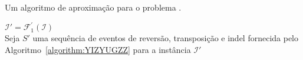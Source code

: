 \begin{algorithm}[!tbh]
  \caption{Um algoritmo de aproximação para o problema \SbFIRTI{}.\label{algorithm:JSNLHIVA}}
  $\mathcal{I}' = \mathcal{F}_{1}^{'}(\mathcal{I})$ \\
  Seja $S'$ uma sequência de eventos de reversão, transposição e indel fornecida pelo Algoritmo~\ref{algorithm:YIZYUGZZ} para a instância $\mathcal{I}'$ \\
\end{algorithm}